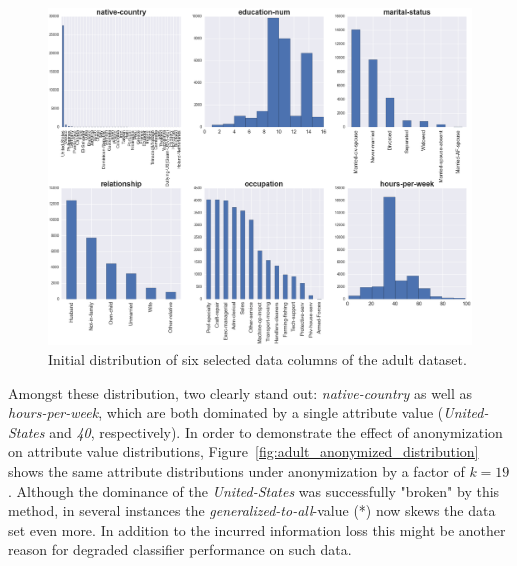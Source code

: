 \documentclass{llncs}
\begin{document}
\begin{figure}[!h]
	\begin{center}
    \hspace*{-0.8cm}
		\includegraphics[width=1.1\textwidth]{figures/theory/dist_initial_small}
		\caption{Initial distribution of six selected data columns of the adult dataset.}
		\label{fig:adult_original_distribution}
	\end{center}
\end{figure}

Amongst these distribution, two clearly stand out: \textit{native-country} as well as \textit{hours-per-week}, which are both dominated by a single attribute value (\textit{United-States} and \textit{40}, respectively). In order to demonstrate the effect of anonymization on attribute value distributions, Figure~\ref{fig:adult_anonymized_distribution} shows the same attribute distributions under anonymization by a factor of $k=19$. Although the dominance of the \textit{United-States} was successfully "broken" by this method, in several instances the \textit{generalized-to-all}-value (*) now skews the data set even more. In addition to the incurred information loss this might be another reason for degraded classifier performance on such data.
\end{document}
